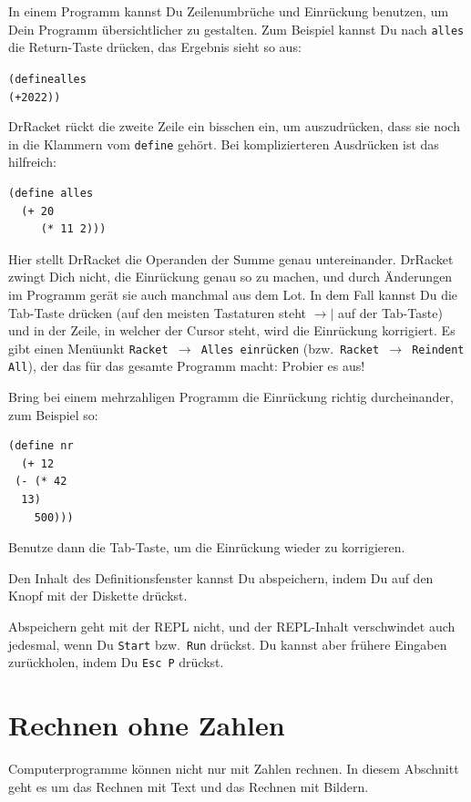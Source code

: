 In einem Programm kannst Du Zeilenumbrüche und Einrückung benutzen, um
Dein Programm übersichtlicher zu gestalten.  Zum Beispiel kannst Du
nach \texttt{alles} die Return-Taste drücken, das Ergebnis sieht so
aus:
%
\begin{alltt}
(define alles
  (+ 20 22))
\end{alltt}
%
DrRacket rückt die zweite Zeile ein bisschen ein, um auszudrücken,
dass sie noch in die Klammern vom \texttt{define} gehört.  Bei
komplizierteren Ausdrücken ist das hilfreich:
%
\begin{verbatim}
(define alles
  (+ 20
     (* 11 2)))
\end{verbatim}
%
Hier stellt DrRacket die Operanden der Summe genau untereinander.
DrRacket zwingt Dich nicht, die Einrückung genau so zu machen, und
durch Änderungen im Programm gerät sie auch manchmal aus dem Lot.  In
dem Fall kannst Du die Tab-Taste drücken (auf den meisten Tastaturen
steht $\longrightarrow\mid$ auf der Tab-Taste) und in der Zeile, in
welcher der Cursor steht, wird die Einrückung korrigiert.  Es gibt
einen Menüunkt \texttt{Racket $\rightarrow$ Alles einrücken} (bzw.\
\texttt{Racket $\rightarrow$ Reindent All}), der das für das gesamte
Programm macht: Probier es aus!

\begin{aufgabe}
  Bring bei einem mehrzahligen Programm die Einrückung richtig
  durcheinander, zum Beispiel so:
\begin{verbatim}
(define nr
  (+ 12
 (- (* 42
  13)
    500)))
\end{verbatim}
  Benutze dann die Tab-Taste, um die Einrückung wieder zu korrigieren.
\end{aufgabe}
%
Den Inhalt des Definitionsfenster kannst Du abspeichern, indem Du auf
den Knopf mit der Diskette
 drückst.

Abspeichern geht mit der REPL nicht, und der REPL-Inhalt verschwindet
auch jedesmal, wenn Du \texttt{Start} bzw.\ \texttt{Run} drückst.  Du
kannst aber frühere Eingaben zurückholen, indem Du \texttt{Esc~P}
drückst.

\section{Rechnen ohne Zahlen}

Computerprogramme können nicht nur mit Zahlen rechnen.  In diesem
Abschnitt geht es um das Rechnen mit Text und das Rechnen mit Bildern.

